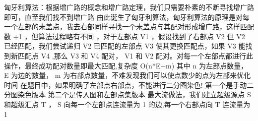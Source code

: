 {}\markdownRendererSectionBegin
{}\markdownRendererInterblockSeparator
{}匈牙利算法：根据增广路的概念和增广路定理，我们只需要朴素的不断寻找增广路即可，直至我们找不到增广路\markdownRendererParagraphSeparator
{}由此诞生了匈牙利算法，匈牙利算法的原理是对每一个左部的未盖点，我去右部同样寻找一个未盖点与其配对形成增广路，这样匹配数\markdownRendererDollarSign{} +1 \markdownRendererDollarSign{}，但算法过程略有不同 ，对于左部点\markdownRendererDollarSign{} V1 \markdownRendererDollarSign{}，假设找到了右部点\markdownRendererDollarSign{} V2 \markdownRendererDollarSign{}但\markdownRendererDollarSign{} V2 \markdownRendererDollarSign{}已经匹配，我们尝试递归\markdownRendererDollarSign{} V2 \markdownRendererDollarSign{}已匹配的左部点\markdownRendererDollarSign{} V3 \markdownRendererDollarSign{}使其更换匹配点，如果\markdownRendererDollarSign{} V3 \markdownRendererDollarSign{}能找到新匹配点\markdownRendererDollarSign{} V4 \markdownRendererDollarSign{},那么\markdownRendererDollarSign{} V3 \markdownRendererDollarSign{}和\markdownRendererDollarSign{} V4 \markdownRendererDollarSign{}配对，\markdownRendererDollarSign{} V1 \markdownRendererDollarSign{}和\markdownRendererDollarSign{} V2 \markdownRendererDollarSign{}配对。对每一个左部点都进行此操作，最终成功配对数量即最大匹配,复杂度\markdownRendererDollarSign{} O(n*E+m) \markdownRendererDollarSign{}其中\markdownRendererDollarSign{} n \markdownRendererDollarSign{}为左部点数量，\markdownRendererDollarSign{} E \markdownRendererDollarSign{}为边的数量，\markdownRendererDollarSign{} m \markdownRendererDollarSign{}为右部点数量，不难发现我们可以使点数少的点为左部来优化时间\markdownRendererParagraphSeparator
{}在题目中，如果明确了左部点右部点，不能进行二分图染色!\markdownRendererParagraphSeparator
{}第一个是手动二分图染色版本\markdownRendererInterblockSeparator
{}\markdownRendererInterblockSeparator
{}第二个是传入图和左部点集版本\markdownRendererInterblockSeparator
{}\markdownRendererInterblockSeparator
{}最大流做法，我们建立超级源点\markdownRendererDollarSign{} S \markdownRendererDollarSign{}和超级汇点\markdownRendererDollarSign{} T \markdownRendererDollarSign{}，\markdownRendererDollarSign{} S \markdownRendererDollarSign{}向每一个左部点连流量为\markdownRendererDollarSign{} 1 \markdownRendererDollarSign{}的边,每一个右部点向\markdownRendererDollarSign{} T \markdownRendererDollarSign{}连流量为\markdownRendererDollarSign{} 1\markdownRendererParagraphSeparator
